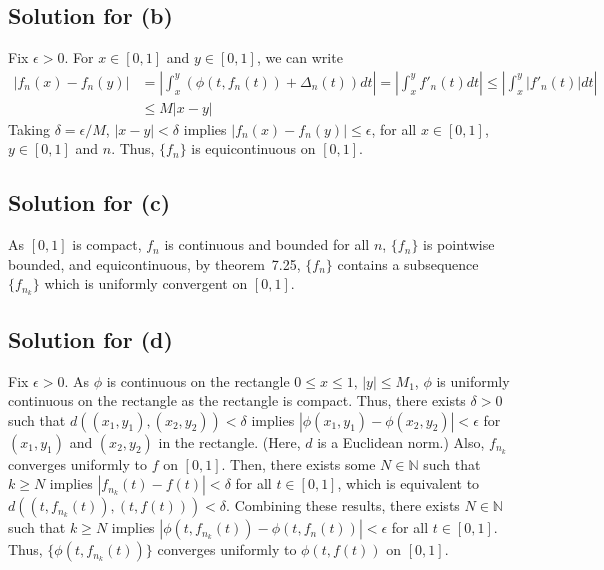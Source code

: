 \documentclass{scrartcl}
\begin{document}
\subsection{Solution for (b)}
Fix \(\epsilon > 0\). For \(x \in [0, 1]\) and \(y \in [0, 1]\), we can write
\begin{align*}
  |f_n(x) - f_n(y)|
  &= \left| \int^y_x (\phi(t, f_n(t)) + \Delta_n(t)) dt \right|
  = \left| \int^y_x f'_n(t) dt \right|
  \le \left| \int^y_x |f'_n(t)| dt \right| \\
  &\le M|x - y|
\end{align*}
Taking \(\delta = \epsilon / M\), \(|x - y| < \delta\) implies \(|f_n(x) -
f_n(y)| \le \epsilon\), for all \(x \in [0, 1]\), \(y \in [0, 1]\) and \(n\).
Thus, \(\{f_n\}\) is equicontinuous on \([0, 1]\).

\subsection{Solution for (c)}
As \([0, 1]\) is compact, \(f_n\) is continuous and bounded for all \(n\),
\(\{f_n\}\) is pointwise bounded, and equicontinuous, by theorem~7.25,
\(\{f_n\}\) contains a subsequence \(\{f_{n_k}\}\) which is uniformly
convergent on \([0, 1]\).

\subsection{Solution for (d)}
Fix \(\epsilon > 0\). As \(\phi\) is continuous on the rectangle \(0 \le x \le
1,\, |y| \le M_1\), \(\phi\) is uniformly continuous on the rectangle as the
rectangle is compact. Thus, there exists \(\delta > 0\) such that \(d((x_1,
y_1), (x_2, y_2)) < \delta\) implies \(|\phi(x_1, y_1) - \phi(x_2, y_2)| <
\epsilon\) for \((x_1, y_1)\) and \((x_2, y_2)\) in the rectangle. (Here,
\(d\) is a Euclidean norm.) Also, \(f_{n_k}\) converges uniformly to \(f\) on
\([0, 1]\). Then, there exists some \(N \in \mathbb{N}\) such that \(k \ge N\)
implies \(|f_{n_k}(t) - f(t)| < \delta\) for all \(t \in [0, 1]\), which is
equivalent to \(d((t, f_{n_k}(t)), (t, f(t))) < \delta\). Combining these
results, there exists \(N \in \mathbb{N}\) such that \(k \ge N\) implies
\(|\phi(t, f_{n_k}(t)) - \phi(t, f_n(t))| < \epsilon\) for all \(t \in [0,
1]\). Thus, \(\{\phi(t, f_{n_k}(t))\}\) converges uniformly to \(\phi(t,
f(t))\) on \([0, 1]\).
\end{document}

